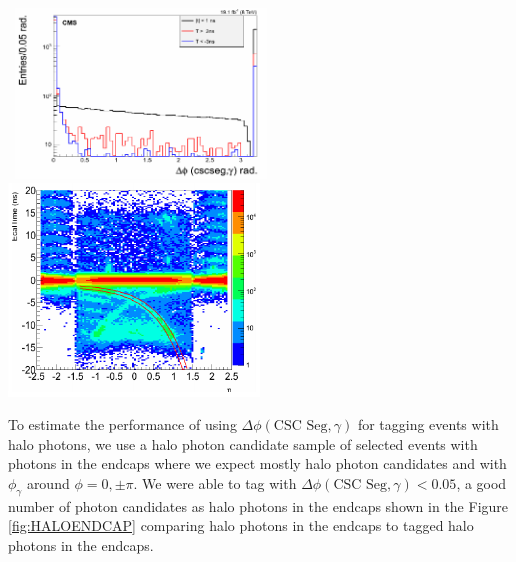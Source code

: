 \vspace{5mm}
\begin{minipage}{0.90\linewidth}  
\begin{center}
\mbox{
\includegraphics[height=0.45\textwidth, width=0.5\textwidth]{THESISPLOTS/CSC-Segment-Halo-Tagging.png}
\includegraphics[height=0.45\textwidth, width=0.5\textwidth]{THESISPLOTS/HALO-ECAL-TIME-Vs-ETA.png}}
\label{fig:HALO}
\end{center}
\end{minipage}

\vspace{5mm}
To estimate the performance of using $\Delta\phi(\mbox{CSC Seg},\gamma)$ for tagging events with halo photons, we use a halo photon candidate sample of selected events with photons in the endcaps where we expect mostly halo photon candidates and with $\phi_{\gamma}$ around $\phi = 0, \pm \pi$. We were able to tag with $\Delta\phi(\mbox{CSC Seg},\gamma) < 0.05$, a good number of photon candidates as halo photons in the endcaps shown in the Figure \ref{fig:HALOENDCAP} comparing halo photons in the endcaps to tagged halo photons in the endcaps.
 
